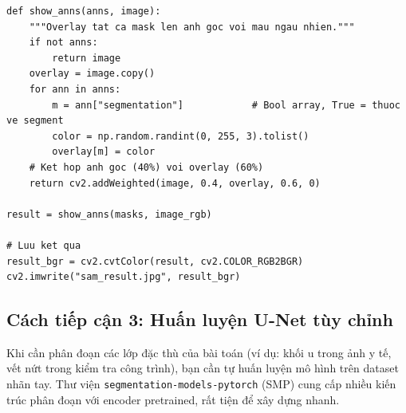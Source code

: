 \begin{verbatim}
def show_anns(anns, image):
    """Overlay tat ca mask len anh goc voi mau ngau nhien."""
    if not anns:
        return image
    overlay = image.copy()
    for ann in anns:
        m = ann["segmentation"]            # Bool array, True = thuoc ve segment
        color = np.random.randint(0, 255, 3).tolist()
        overlay[m] = color
    # Ket hop anh goc (40%) voi overlay (60%)
    return cv2.addWeighted(image, 0.4, overlay, 0.6, 0)

result = show_anns(masks, image_rgb)

# Luu ket qua
result_bgr = cv2.cvtColor(result, cv2.COLOR_RGB2BGR)
cv2.imwrite("sam_result.jpg", result_bgr)
\end{verbatim}

\subsection{Cách tiếp cận 3: Huấn luyện U-Net tùy chỉnh}
\label{subsec:seg_unet}

Khi cần phân đoạn các lớp đặc thù của bài toán (ví dụ: khối u trong ảnh y tế, vết nứt trong kiểm tra công trình), bạn cần tự huấn luyện mô hình trên dataset nhãn tay. Thư viện \texttt{segmentation-models-pytorch} (SMP) cung cấp nhiều kiến trúc phân đoạn với encoder pretrained, rất tiện để xây dựng nhanh.

